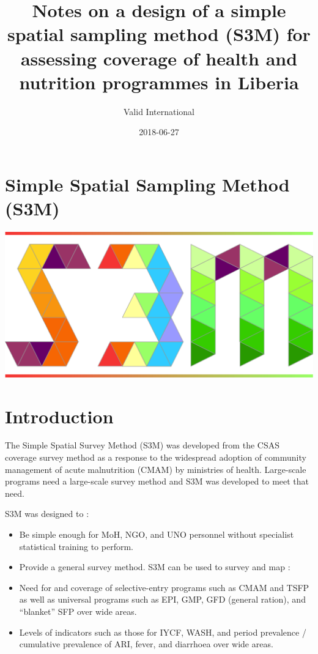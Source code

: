 \documentclass[12pt,a4paper]{book}
\title{Notes on a design of a simple spatial sampling method (S3M) for
assessing coverage of health and nutrition programmes in Liberia}
\author{Valid International}
\date{2018-06-27}
\theoremstyle{definition}
\theoremstyle{definition}
\theoremstyle{definition}
\theoremstyle{remark}
\begin{document}
\maketitle

{
\hypersetup{linkcolor=black}
\setcounter{tocdepth}{1}
\tableofcontents
}
\hypertarget{simple-spatial-sampling-method-s3m}{%
\chapter*{Simple Spatial Sampling Method
(S3M)}\label{simple-spatial-sampling-method-s3m}}

\includegraphics{figures/s3mlogo.png}

\hypertarget{introduction}{%
\chapter{Introduction}\label{introduction}}

The Simple Spatial Survey Method (S3M) was developed from the CSAS
coverage survey method as a response to the widespread adoption of
community management of acute malnutrition (CMAM) by ministries of
health. Large-scale programs need a large-scale survey method and S3M
was developed to meet that need.

S3M was designed to :

\begin{itemize}
\item
  Be simple enough for MoH, NGO, and UNO personnel without specialist
  statistical training to perform.
\item
  Provide a general survey method. S3M can be used to survey and map :
\item
  Need for and coverage of selective-entry programs such as CMAM and
  TSFP as well as universal programs such as EPI, GMP, GFD (general
  ration), and ``blanket'' SFP over wide areas.
\item
  Levels of indicators such as those for IYCF, WASH, and period
  prevalence / cumulative prevalence of ARI, fever, and diarrhoea over
  wide areas.
\end{itemize}
\end{document}
